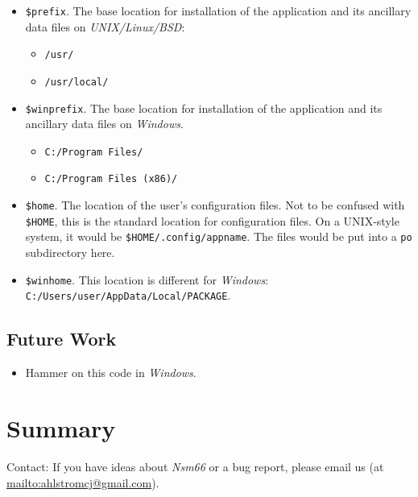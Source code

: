 \documentclass[
 11pt,
 twoside,
 a4paper,
 final                                 %
]{article}
\begin{document}
   \begin{itemize}
      \item \texttt{\$prefix}. The base location for installation of
         the application and its ancillary data files on
         \textsl{UNIX/Linux/BSD}:
         \begin{itemize}
            \item \texttt{/usr/}
            \item \texttt{/usr/local/}
         \end{itemize}
      \item \texttt{\$winprefix}. The base location for installation of
         the application and its ancillary data files on \textsl{Windows}.
         \begin{itemize}
            \item \texttt{C:/Program Files/}
            \item \texttt{C:/Program Files (x86)/}
         \end{itemize}
      \item \texttt{\$home}. The location of the user's configuration files.
         Not to be confused with \texttt{\$HOME}, this is
         the standard location for configuration files.
         On a UNIX-style system, it would be \linebreak
         \texttt{\$HOME/.config/appname}.
         The files would be put into a \texttt{po} subdirectory here.
      \item \texttt{\$winhome}. This location is different for
         \textsl{Windows}:
         \texttt{C:/Users/user/AppData/Local/PACKAGE}.
   \end{itemize}

\subsection{Future Work}
\label{subsec:introduction_future}

   \begin{itemize}
      \item Hammer on this code in \textsl{Windows}.
   \end{itemize}


% 

\section{Summary}
\label{sec:summary}

   Contact: If you have ideas about \textsl{Nsm66} or a bug report,
   please email us (at \url{mailto:ahlstromcj@gmail.com}).




\printindex
\end{document}
